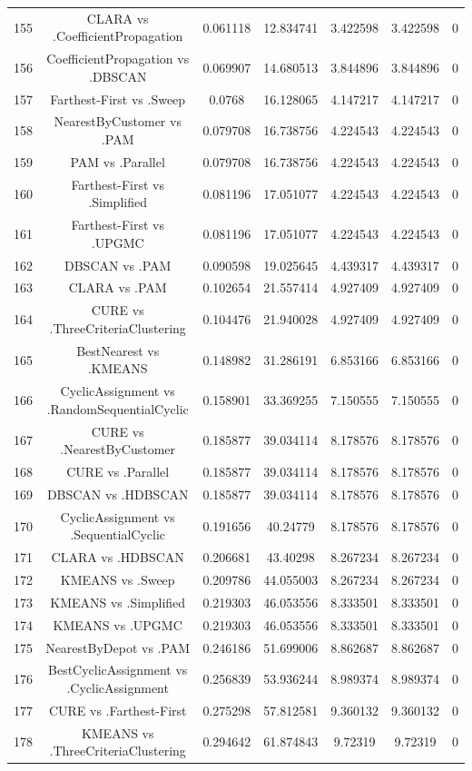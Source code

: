 \documentclass[a4paper,10pt]{article}
\begin{document}
\begin{landscape}
\begin{table}[!htp]
\begin{tabular}{ccccccc}
155&CLARA vs .CoefficientPropagation&0.061118&12.834741&3.422598&3.422598&0\\
156&CoefficientPropagation vs .DBSCAN&0.069907&14.680513&3.844896&3.844896&0\\
157&Farthest-First vs .Sweep&0.0768&16.128065&4.147217&4.147217&0\\
158&NearestByCustomer vs .PAM&0.079708&16.738756&4.224543&4.224543&0\\
159&PAM vs .Parallel&0.079708&16.738756&4.224543&4.224543&0\\
160&Farthest-First vs .Simplified&0.081196&17.051077&4.224543&4.224543&0\\
161&Farthest-First vs .UPGMC&0.081196&17.051077&4.224543&4.224543&0\\
162&DBSCAN vs .PAM&0.090598&19.025645&4.439317&4.439317&0\\
163&CLARA vs .PAM&0.102654&21.557414&4.927409&4.927409&0\\
164&CURE vs .ThreeCriteriaClustering&0.104476&21.940028&4.927409&4.927409&0\\
165&BestNearest vs .KMEANS&0.148982&31.286191&6.853166&6.853166&0\\
166&CyclicAssignment vs .RandomSequentialCyclic&0.158901&33.369255&7.150555&7.150555&0\\
167&CURE vs .NearestByCustomer&0.185877&39.034114&8.178576&8.178576&0\\
168&CURE vs .Parallel&0.185877&39.034114&8.178576&8.178576&0\\
169&DBSCAN vs .HDBSCAN&0.185877&39.034114&8.178576&8.178576&0\\
170&CyclicAssignment vs .SequentialCyclic&0.191656&40.24779&8.178576&8.178576&0\\
171&CLARA vs .HDBSCAN&0.206681&43.40298&8.267234&8.267234&0\\
172&KMEANS vs .Sweep&0.209786&44.055003&8.267234&8.267234&0\\
173&KMEANS vs .Simplified&0.219303&46.053556&8.333501&8.333501&0\\
174&KMEANS vs .UPGMC&0.219303&46.053556&8.333501&8.333501&0\\
175&NearestByDepot vs .PAM&0.246186&51.699006&8.862687&8.862687&0\\
176&BestCyclicAssignment vs .CyclicAssignment&0.256839&53.936244&8.989374&8.989374&0\\
177&CURE vs .Farthest-First&0.275298&57.812581&9.360132&9.360132&0\\
178&KMEANS vs .ThreeCriteriaClustering&0.294642&61.874843&9.72319&9.72319&0\\

\end{tabular}
\end{table}
\end{landscape}
\end{document}
